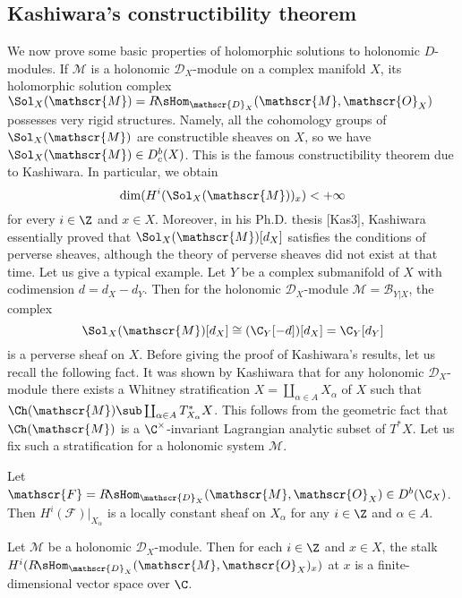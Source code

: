 \subsection{Kashiwara's constructibility theorem}
We now prove some basic properties of holomorphic solutions to holonomic $D$-modules. If $\mathscr{M}$ is a holonomic $\mathscr{D}_X$-module on a complex manifold $X$, its holomorphic solution complex $\Sol_X(\mathscr{M})=R\!\sHom_{\mathscr{D}_X}(\mathscr{M},\mathscr{O}_X)$ possesses very rigid structures. Namely, all the cohomology groups of $\Sol_X(\mathscr{M})$ are constructible sheaves on $X$, so we have $\Sol_X(\mathscr{M})\in D^b_c(X)$. This is the famous constructibility theorem due to Kashiwara. In particular, we obtain
\[\dim(H^i(\Sol_X(\mathscr{M}))_x)<+\infty\]
for every $i\in\Z$ and $x\in X$. Moreover, in his Ph.D. thesis [Kas3], Kashiwara essentially proved that $\Sol_X(\mathscr{M})[d_X]$ satisfies the conditions of perverse sheaves, although the theory of perverse sheaves did not exist at that time. Let us give a typical example. Let $Y$ be a complex submanifold of $X$ with codimension $d=d_X-d_Y$. Then for the holonomic $\mathscr{D}_X$-module $\mathscr{M}=\mathscr{B}_{Y|X}$, the complex
\[\Sol_X(\mathscr{M})[d_X]\cong(\C_Y[-d])[d_X]=\C_Y[d_Y]\]
is a perverse sheaf on $X$. Before giving the proof of Kashiwara's results, let us recall the following fact. It was shown by Kashiwara that for any holonomic $\mathscr{D}_X$-module there exists a Whitney stratification $X=\coprod_{\alpha\in A}X_\alpha$ of $X$ such that $\Ch(\mathscr{M})\sub\coprod_{\alpha\in A}T_{X_\alpha}^*X$. This follows from the geometric fact that $\Ch(\mathscr{M})$ is a $\C^\times$-invariant Lagrangian analytic subset of $T^*X$. Let us fix such a stratification for a holonomic system $\mathscr{M}$.

\begin{proposition}\label{D-module holonomic locally constant on Whitney stratification}
Let $\mathscr{F}=R\!\sHom_{\mathscr{D}_X}(\mathscr{M},\mathscr{O}_X)\in D^b(\C_X)$. Then $H^i(\mathscr{F})|_{X_\alpha}$ is a locally constant sheaf on $X_\alpha$ for any $i\in\Z$ and $\alpha\in A$.
\end{proposition}

\begin{proposition}\label{D-module holonomic RHom by O_X stalk finite dimensional}
Let $\mathscr{M}$ be a holonomic $\mathscr{D}_X$-module. Then for each $i\in\Z$ and $x\in X$, the stalk $H^i(R\!\sHom_{\mathscr{D}_X}(\mathscr{M},\mathscr{O}_X)_x)$ at $x$ is a finite-dimensional vector space over $\C$.
\end{proposition}

